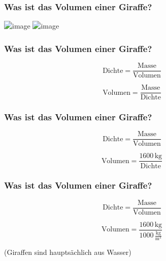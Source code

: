 \documentclass{beamer}
\begin{document}
\begin{frame}
\end{frame}



\begin{frame}
\frametitle{Was ist das Volumen einer Giraffe?}

 
\begin{center}
\includegraphics<1>[width=0.6\textwidth]{giraffe_volumen_1.png}
\includegraphics<2>[width=0.6\textwidth]{giraffe_volumen_2.png}
\end{center}



\end{frame}


\begin{frame}
\frametitle{Was ist das Volumen einer Giraffe?}


\[ 
\text{Dichte}  = \frac{\text{Masse}}{\text{Volumen}}
\]

\[
\text{Volumen} =  \frac{\text{Masse}}{\text{Dichte}} 
\]


\end{frame}

\begin{frame}
\frametitle{Was ist das Volumen einer Giraffe?}


\[ 
\text{Dichte}  = \frac{\text{Masse}}{\text{Volumen}}
\]
 
\[
\text{Volumen} =  \frac{1600\,\text{kg}}{\text{Dichte}} 
\]



\end{frame}


\begin{frame}
\frametitle{Was ist das Volumen einer Giraffe?}


\[ 
\text{Dichte}  = \frac{\text{Masse}}{\text{Volumen}}
\]
 
\[
\text{Volumen} =  \frac{1600\,\text{kg}}{1000\,\frac{\text{kg}}{\text{m}^3}} 
\]


\pause

(Giraffen sind hauptsächlich aus Wasser)


\end{frame}
\end{document}
